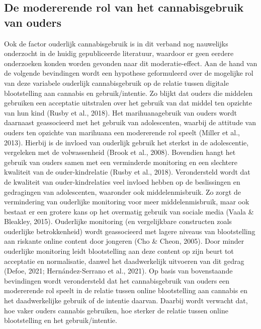 \documentclass[
  letterpaper,
  DIV=11,
  numbers=noendperiod]{scrartcl}
\begin{document}
\hypertarget{de-modererende-rol-van-het-cannabisgebruik-van-ouders}{%
\subsection{De modererende rol van het cannabisgebruik van
ouders}\label{de-modererende-rol-van-het-cannabisgebruik-van-ouders}}

Ook de factor ouderlijk cannabisgebruik is in dit verband nog nauwelijks
onderzocht in de huidig gepubliceerde literatuur, waardoor er geen
eerdere onderzoeken konden worden gevonden naar dit moderatie-effect.
Aan de hand van de volgende bevindingen wordt een hypothese geformuleerd
over de mogelijke rol van deze variabele ouderlijk cannabisgebruik op de
relatie tussen digitale blootstelling aan cannabis en gebruik/intentie.
Zo blijkt dat ouders die middelen gebruiken een acceptatie uitstralen
over het gebruik van dat middel ten opzichte van hun kind (Rusby et al.,
2018). Het marihuanagebruik van ouders wordt daarnaast geassocieerd met
het gebruik van adolescenten, waarbij de attitude van ouders ten
opzichte van marihuana een modererende rol speelt (Miller et al., 2013).
Hierbij is de invloed van ouderlijk gebruik het sterkst in de
adolescentie, vergeleken met de volwassenheid (Brook et al., 2008).
Bovendien hangt het gebruik van ouders samen met een verminderde
monitoring en een slechtere kwaliteit van de ouder-kindrelatie (Rusby et
al., 2018). Verondersteld wordt dat de kwaliteit van ouder-kindrelaties
veel invloed hebben op de beslissingen en gedragingen van adolescenten,
waaronder ook middelenmisbruik. Zo zorgt de vermindering van ouderlijke
monitoring voor meer middelenmisbruik, maar ook bestaat er een grotere
kans op het overmatig gebruik van sociale media (Vaala \& Bleakley,
2015). Ouderlijke monitoring (en vergelijkbare constructen zoals
ouderlijke betrokkenheid) wordt geassocieerd met lagere niveaus van
blootstelling aan riskante online content door jongeren (Cho \& Cheon,
2005). Door minder ouderlijke monitoring leidt blootstelling aan deze
content op zijn beurt tot acceptatie en normalisatie, danwel het
daadwerkelijk uitvoeren van dit gedrag (Defoe, 2021; Hernández-Serrano
et al., 2021). Op basis van bovenstaande bevindingen wordt verondersteld
dat het cannabisgebruik van ouders een modererende rol speelt in de
relatie tussen online blootstelling aan cannabis en het daadwerkelijke
gebruik of de intentie daarvan. Daarbij wordt verwacht dat, hoe vaker
ouders cannabis gebruiken, hoe sterker de relatie tussen online
blootstelling en het gebruik/intentie.
\end{document}
